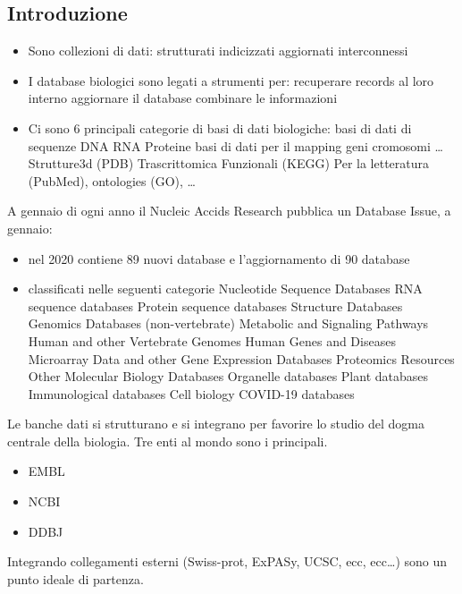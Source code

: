 \documentclass{article}
\begin{document}
\subsection{Introduzione}
\begin{itemize}
    \item Sono collezioni di dati:
        \subitem{-} strutturati
        \subitem{-} indicizzati
        \subitem{-} aggiornati
        \subitem{-} interconnessi
    \item I database biologici sono legati a strumenti per:
        \subitem{-} recuperare records al loro interno 
        \subitem{-} aggiornare il database
        \subitem{-} combinare le informazioni
    \item Ci sono 6 principali categorie di basi di dati biologiche:
        \subitem{-} basi di dati di sequenze
            \subsubitem DNA
            \subsubitem RNA
            \subsubitem Proteine
        \subitem{-} basi di dati per il mapping
            \subsubitem geni
            \subsubitem cromosomi
            \subsubitem \dots
        \subitem{-} Strutture3d (PDB)
        \subitem{-} Trascrittomica
        \subitem{-} Funzionali (KEGG)
        \subitem{-} Per la letteratura (PubMed), ontologies (GO), \dots
\end{itemize}
A gennaio di ogni anno il Nucleic Accids Research pubblica un Database Issue, a gennaio:
\begin{itemize}
    \item nel 2020 contiene 89 nuovi database e l'aggiornamento di 90 database
    \item classificati nelle seguenti categorie
        \subitem{-} Nucleotide Sequence Databases
        \subitem{-} RNA sequence databases
        \subitem{-} Protein sequence databases
        \subitem{-} Structure Databases
        \subitem{-} Genomics Databases (non-vertebrate)
        \subitem{-} Metabolic and Signaling Pathways
        \subitem{-} Human and other Vertebrate Genomes
        \subitem{-} Human Genes and Diseases
        \subitem{-} Microarray Data and other Gene Expression Databases
        \subitem{-} Proteomics Resources
        \subitem{-} Other Molecular Biology Databases
        \subitem{-} Organelle databases
        \subitem{-} Plant databases
        \subitem{-} Immunological databases
        \subitem{-} Cell biology
        \subitem{-} COVID-19 databases
\end{itemize}
Le banche dati si strutturano e si integrano per favorire lo studio del dogma centrale della biologia.
Tre enti al mondo sono i principali.
\begin{itemize}
    \item EMBL
    \item NCBI
    \item DDBJ
\end{itemize}
Integrando collegamenti esterni (Swiss-prot, ExPASy,
UCSC, ecc, ecc…) sono un punto ideale di partenza.
\end{document}
